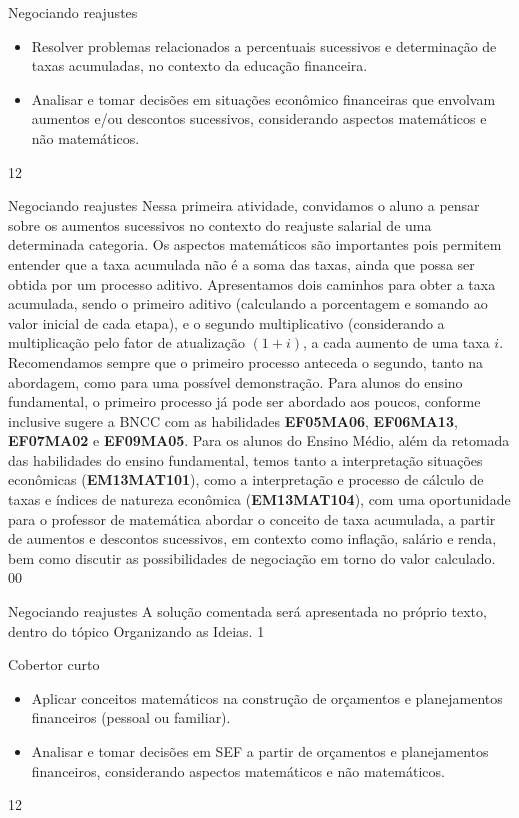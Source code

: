 \clearpage
\begin{objectives}{Negociando reajustes}
{
\begin{itemize}
\item Resolver problemas relacionados a percentuais sucessivos e determinação de taxas acumuladas, no contexto da educação financeira.
\item Analisar e tomar decisões em situações econômico financeiras que envolvam aumentos e/ou descontos sucessivos, considerando aspectos matemáticos e não matemáticos.
\end{itemize}
}{1}{2}
\end{objectives}
\begin{sugestions}{Negociando reajustes}
{
Nessa primeira atividade, convidamos o aluno a pensar sobre os aumentos sucessivos no contexto do reajuste salarial de uma determinada categoria. Os aspectos matemáticos são importantes pois permitem entender que a taxa acumulada não é a soma das taxas, ainda que possa ser obtida por um processo aditivo. Apresentamos dois caminhos para obter a taxa acumulada, sendo o primeiro aditivo (calculando a porcentagem e somando ao valor inicial de cada etapa), e o segundo multiplicativo (considerando a multiplicação pelo fator de atualização $(1+i)$, a cada aumento de uma taxa $i$. Recomendamos sempre que o primeiro processo anteceda o segundo, tanto na abordagem, como para uma possível demonstração. Para alunos do ensino fundamental, o primeiro processo já pode ser abordado aos poucos, conforme inclusive sugere a BNCC com as habilidades \textbf{EF05MA06}, \textbf{EF06MA13}, \textbf{EF07MA02} e \textbf{EF09MA05}. Para os alunos do Ensino Médio, além da retomada das habilidades do ensino fundamental, temos tanto a interpretação situações econômicas (\textbf{EM13MAT101}), como a interpretação e processo de cálculo de taxas e índices de natureza econômica (\textbf{EM13MAT104}), com uma oportunidade para o professor de matemática abordar o conceito de taxa acumulada, a partir de aumentos e descontos sucessivos, em contexto como inflação, salário e renda, bem como discutir as possibilidades de negociação em torno do valor calculado. 
}{0}{0}
\end{sugestions}
\marginpar{\vspace{.5em}}
\begin{answer}{Negociando reajustes}
{
A solução comentada será apresentada no próprio texto, dentro do tópico Organizando as Ideias.
}{1}
\end{answer}
\begin{objectives}{Cobertor curto}
{
\begin{itemize}
\item Aplicar conceitos matemáticos na construção de orçamentos e planejamentos financeiros (pessoal ou familiar).
\item Analisar e tomar decisões em SEF a partir de orçamentos e planejamentos financeiros, considerando aspectos matemáticos e não matemáticos.
\end{itemize}

}{1}{2}
\end{objectives}
